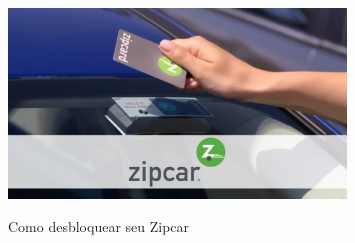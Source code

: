 \begin{figure}[!hbtp]
	\centering
	\caption{Como desbloquear seu Zipcar}
	\includegraphics[width=0.8\textwidth]{./04-figuras/zipcar/zipcar.jpg}
	\label{fig:zipcar}
\end{figure}


